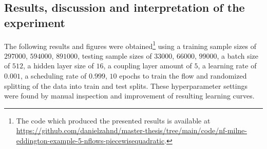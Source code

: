 \documentclass[a4paper,12pt]{report}
\begin{document}
\subsection{Results, discussion and interpretation of the experiment}
The following results and figures were obtained\footnote{The code which produced the presented results is available at \url{https://github.com/danielzahnd/master-thesis/tree/main/code/nf-milne-eddington-example-5-nflows-piecewisequadratic}.} using a training sample sizes of $297000$, $594000$, $891000$, testing sample sizes of $33000$, $66000$, $99000$, a batch size of $512$, a hidden layer size of $16$, a coupling layer amount of $5$, a learning rate of $0.001$, a scheduling rate of $0.999$, $10$ epochs to train the flow and randomized splitting of the data into train and test splits. These hyperparameter settings were found by manual inspection and improvement of resulting learning curves.
\end{document}

